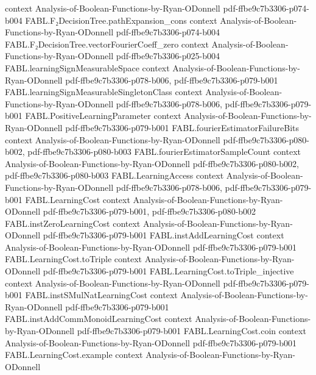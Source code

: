 \begin{theorem}
  {context}
  {Analysis-of-Boolean-Functions-by-Ryan-ODonnell}
  {pdf-ffbe9c7b3306-p074-b004}
\proofstep
  {FABL.F₂DecisionTree.pathExpansion_cons}
  {context}
  {Analysis-of-Boolean-Functions-by-Ryan-ODonnell}
  {pdf-ffbe9c7b3306-p074-b004}
\proofstep
  {FABL.F₂DecisionTree.vectorFourierCoeff_zero}
  {context}
  {Analysis-of-Boolean-Functions-by-Ryan-ODonnell}
  {pdf-ffbe9c7b3306-p025-b004}
\proofstep
  {FABL.learningSignMeasurableSpace}
  {context}
  {Analysis-of-Boolean-Functions-by-Ryan-ODonnell}
  {pdf-ffbe9c7b3306-p078-b006,
    pdf-ffbe9c7b3306-p079-b001}
\proofstep
  {FABL.learningSignMeasurableSingletonClass}
  {context}
  {Analysis-of-Boolean-Functions-by-Ryan-ODonnell}
  {pdf-ffbe9c7b3306-p078-b006,
    pdf-ffbe9c7b3306-p079-b001}
\proofstep
  {FABL.PositiveLearningParameter}
  {context}
  {Analysis-of-Boolean-Functions-by-Ryan-ODonnell}
  {pdf-ffbe9c7b3306-p079-b001}
\proofstep
  {FABL.fourierEstimatorFailureBits}
  {context}
  {Analysis-of-Boolean-Functions-by-Ryan-ODonnell}
  {pdf-ffbe9c7b3306-p080-b002,
    pdf-ffbe9c7b3306-p080-b003}
\proofstep
  {FABL.fourierEstimatorSampleCount}
  {context}
  {Analysis-of-Boolean-Functions-by-Ryan-ODonnell}
  {pdf-ffbe9c7b3306-p080-b002,
    pdf-ffbe9c7b3306-p080-b003}
\proofstep
  {FABL.LearningAccess}
  {context}
  {Analysis-of-Boolean-Functions-by-Ryan-ODonnell}
  {pdf-ffbe9c7b3306-p078-b006,
    pdf-ffbe9c7b3306-p079-b001}
\proofstep
  {FABL.LearningCost}
  {context}
  {Analysis-of-Boolean-Functions-by-Ryan-ODonnell}
  {pdf-ffbe9c7b3306-p079-b001,
    pdf-ffbe9c7b3306-p080-b002}
\proofstep
  {FABL.instZeroLearningCost}
  {context}
  {Analysis-of-Boolean-Functions-by-Ryan-ODonnell}
  {pdf-ffbe9c7b3306-p079-b001}
\proofstep
  {FABL.instAddLearningCost}
  {context}
  {Analysis-of-Boolean-Functions-by-Ryan-ODonnell}
  {pdf-ffbe9c7b3306-p079-b001}
\proofstep
  {FABL.LearningCost.toTriple}
  {context}
  {Analysis-of-Boolean-Functions-by-Ryan-ODonnell}
  {pdf-ffbe9c7b3306-p079-b001}
\proofstep
  {FABL.LearningCost.toTriple_injective}
  {context}
  {Analysis-of-Boolean-Functions-by-Ryan-ODonnell}
  {pdf-ffbe9c7b3306-p079-b001}
\proofstep
  {FABL.instSMulNatLearningCost}
  {context}
  {Analysis-of-Boolean-Functions-by-Ryan-ODonnell}
  {pdf-ffbe9c7b3306-p079-b001}
\proofstep
  {FABL.instAddCommMonoidLearningCost}
  {context}
  {Analysis-of-Boolean-Functions-by-Ryan-ODonnell}
  {pdf-ffbe9c7b3306-p079-b001}
\proofstep
  {FABL.LearningCost.coin}
  {context}
  {Analysis-of-Boolean-Functions-by-Ryan-ODonnell}
  {pdf-ffbe9c7b3306-p079-b001}
\proofstep
  {FABL.LearningCost.example}
  {context}
  {Analysis-of-Boolean-Functions-by-Ryan-ODonnell}

\end{theorem}
